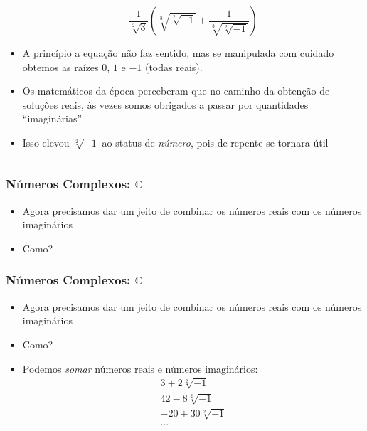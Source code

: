 \documentclass[usenames,dvipsnames,svgnames]{beamer}
\begin{document}
\begin{frame}
\begin{columns}[t]
\begin{column}{.7\textwidth}
\begin{itemize}
			\begin{equation}
				\frac{1}{\sqrt[2]{3}}\left( \sqrt[3]{\sqrt[2]{-1}} + \frac{1}{\sqrt[3]{\sqrt[2]{-1}}} \right)
			\end{equation}
		\item A princípio a equação não faz sentido, mas se manipulada com cuidado obtemos as raízes $0$, $1$ e $-1$ (todas reais).
		\item Os matemáticos da época perceberam que no caminho da obtenção de soluções reais, às vezes somos obrigados a passar por quantidades ``imaginárias''
		\item Isso elevou $\sqrt[2]{-1}$ ao status de \emph{número}, pois de repente se tornara útil
		\end{itemize}
	\end{column}
	\end{columns}

\end{frame}

\begin{frame}
	\frametitle{Números Complexos: $\mathbb{C}$}

	\begin{itemize}
		\item Agora precisamos dar um jeito de combinar os números reais com os números imaginários
		\item Como?
	\end{itemize}

\end{frame}

\begin{frame}
	\frametitle{Números Complexos: $\mathbb{C}$}

	\begin{itemize}
		\item Agora precisamos dar um jeito de combinar os números reais com os números imaginários
		\item Como?
		\item Podemos \emph{somar} números reais e números imaginários:
			\begin{equation}
			\begin{aligned}
				3 + 2\sqrt[2]{-1} \\
				42 - 8\sqrt[2]{-1} \\
				-20 + 30\sqrt[2]{-1} \\
				\dots
			\end{aligned}
			\end{equation}
	\end{itemize}

\end{frame}
\end{document}
